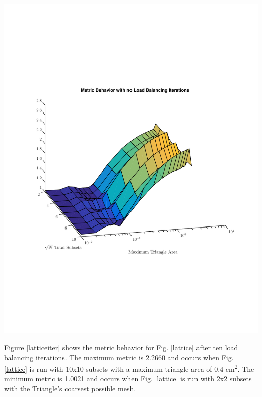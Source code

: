 \noindent\begin{minipage}{\textwidth}
\centering
\includegraphics[scale=0.80, trim = 2cm 6cm 2cm 7cm,clip]{figures/lattice_no_iter.pdf}
\label{latticenoiter}
\end{minipage}
\smallskip

Figure \ref{latticeiter} shows the metric behavior for Fig. \ref{lattice} after ten load balancing iterations. The maximum metric is 2.2660 and occurs when Fig. \ref{lattice} is run with 10x10 subsets with a maximum triangle area of 0.4 cm\textsuperscript{2}. The minimum metric is 1.0021 and occurs when Fig. \ref{lattice} is run with 2x2 subsets with the Triangle's coarsest possible mesh.

